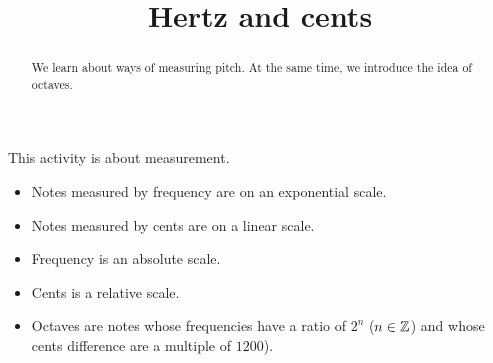 \documentclass[12pt,noauthor,nooutcomes,handout,hints]{ximera}
\author{}
\title{Hertz and cents}
\begin{document}
\begin{abstract}
  We learn about ways of measuring pitch. At the same time, we introduce the idea of octaves.
\end{abstract}
\maketitle

\begin{instructorNotes}
This activity is about measurement. 
\begin{itemize}
\item Notes measured by frequency are on an exponential scale. 
\item Notes measured by cents are on a linear scale. 
\item Frequency is an absolute scale.
\item Cents is a relative scale.
\item Octaves are notes whose frequencies have a ratio of $2^n$ ($n\in\mathbb Z$) and whose cents difference are a multiple of $1200$).

\end{itemize}




\end{instructorNotes}
\end{document}
